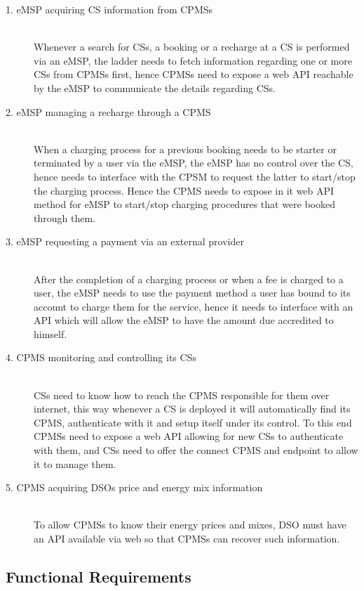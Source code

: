\documentclass[11pt]{article}
\begin{document}
\begin{description}
    \item [1. eMSP acquiring CS information from CPMSs] \hfill \\
        Whenever a search for CSs, a booking or a recharge at a CS is performed via an eMSP, the ladder needs to fetch information regarding one or more CSs from CPMSs first, hence CPMSs need to expose a web API reachable by the eMSP to communicate the details regarding CSs.
    \item [2. eMSP  managing a recharge through a CPMS] \hfill \\
        When a charging process for a previous booking needs to be starter or terminated by a user via the eMSP, the eMSP has no control over the CS, hence needs to interface with the CPSM to request the latter to start/stop the charging process. Hence the CPMS needs to expose in it web API method for eMSP to start/stop charging procedures that were booked through them.
    \item [3. eMSP requesting a payment via an external provider] \hfill \\
        After the completion of a charging process or when a fee is charged to a user, the eMSP needs to use the payment method a user has bound to its account to charge them for the service, hence it needs to interface with an API which will allow the eMSP to have the amount due accredited to himself.
    \item [4. CPMS monitoring and controlling its CSs] \hfill \\
        CSs need to know how to reach the CPMS responsible for them over internet, this way whenever a CS is deployed it will automatically find its CPMS, authenticate with it and setup itself under its control. To this end CPMSs need to expose a web API allowing for new CSs to authenticate with them, and CSs need to offer the connect CPMS and endpoint to allow it to manage them.
    \item [5. CPMS acquiring DSOs price and energy mix information] \hfill \\
        To allow CPMSs to know their energy prices and mixes, DSO must have an API available via web so that CPMSs can recover such information.
\end{description}

\newpage

\subsection{Functional Requirements}
\end{document}
